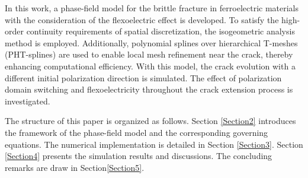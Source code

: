 In this work, a phase-field model for the brittle fracture in ferroelectric materials with the consideration of the flexoelectric effect is developed. To satisfy the high-order continuity requirements of spatial discretization, the isogeometric analysis method is employed. Additionally, polynomial splines over hierarchical T-meshes (PHT-splines) are used to enable local mesh refinement near the crack, thereby enhancing computational efficiency. With this model, the crack evolution with a different initial polarization direction is simulated. The effect of polarization domain switching and flexoelectricity throughout the crack extension process is investigated. 

The structure of this paper is organized as follows. Section \ref{Section2} introduces the framework of the phase-field model and the corresponding governing equations. The numerical implementation is detailed in Section \ref{Section3}. Section \ref{Section4} presents the simulation results and discussions. The concluding remarks are draw in Section\ref{Section5}.